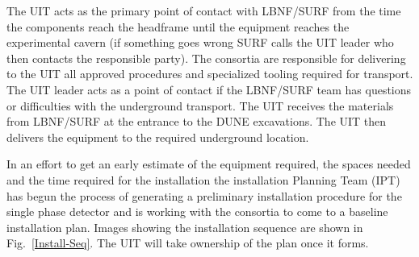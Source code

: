The UIT acts as the primary point of contact with LBNF/SURF from the
time the components reach the headframe until the equipment reaches
the experimental cavern (if something goes wrong SURF calls the UIT
leader who then contacts the responsible party). The consortia are
responsible for delivering to the UIT all approved procedures and
specialized tooling required for transport. The UIT leader acts as a
point of contact if the LBNF/SURF team has questions or difficulties
with the underground transport.  The UIT receives the materials from
LBNF/SURF at the entrance to the DUNE excavations. The UIT then
delivers the equipment to the required underground location.

In an effort to get an early estimate of the equipment required, the
spaces needed and the time required for the installation the
installation Planning Team (IPT) has begun the process of generating a
preliminary installation procedure for the single phase detector and
is working with the consortia to come to a baseline installation
plan. Images showing the installation sequence are shown in
Fig.~\ref{Install-Seq}. The UIT will take ownership of the plan once
it forms.  
